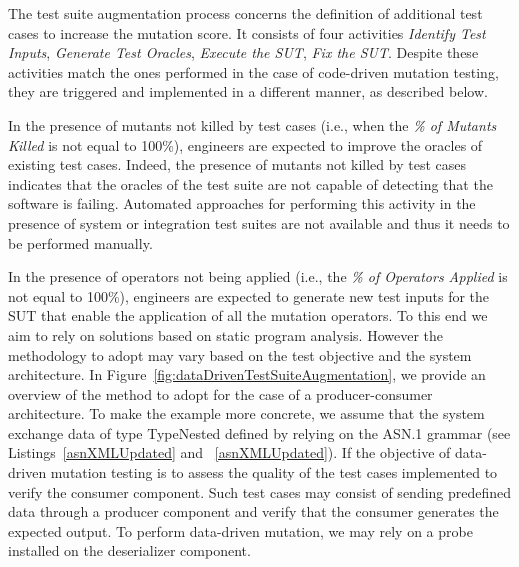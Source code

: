 The test suite augmentation process concerns the definition of additional test cases to increase the mutation score.
It consists of four activities \emph{Identify Test Inputs}, \emph{Generate Test Oracles}, \emph{Execute the SUT}, \emph{Fix the SUT}. 
Despite these activities match the ones performed in the case of code-driven mutation testing, they are triggered and implemented in a different manner, as described below.

In the presence of mutants not killed by test cases (i.e., when the \emph{\% of Mutants Killed} is not equal to 100\%), engineers are expected to improve the oracles of existing test cases. Indeed, the presence of mutants not killed by test cases indicates that the oracles of the test suite are not capable of detecting that the software is failing. 
Automated approaches for performing this activity in the presence of system or integration test suites are not available and thus it needs to be performed manually.

In the presence of operators not being applied (i.e., the \emph{\% of Operators Applied} is not equal to 100\%), engineers are expected to generate new test inputs for the SUT that enable the application of all the mutation operators. 
To this end we aim to rely on solutions based on static program analysis. 
However the methodology to adopt may vary based on the test objective and the system architecture. In Figure~\ref{fig:dataDrivenTestSuiteAugmentation}, we provide an overview of the method to adopt for the case of a producer-consumer architecture. To make the example more concrete, we assume that the system exchange data of type TypeNested defined by relying on the ASN.1 grammar (see Listings~\ref{asnXMLUpdated} and ~\ref{asnXMLUpdated}). 
If the objective of data-driven mutation testing is to assess the quality of the test cases implemented to verify the consumer component. 
Such test cases may consist of sending predefined data through a producer component and verify that the consumer generates the expected output. 
To perform data-driven mutation, we may rely on a probe installed on the deserializer component. 

